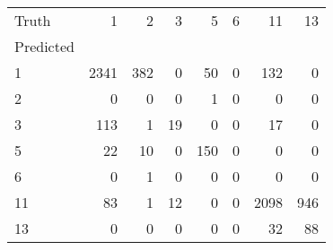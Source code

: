 \begin{tabular}{lrrrrrrr}
\toprule
Truth & 1 & 2 & 3 & 5 & 6 & 11 & 13 \\
Predicted &  &  &  &  &  &  &  \\
\midrule
1 & 2341 & 382 & 0 & 50 & 0 & 132 & 0 \\
2 & 0 & 0 & 0 & 1 & 0 & 0 & 0 \\
3 & 113 & 1 & 19 & 0 & 0 & 17 & 0 \\
5 & 22 & 10 & 0 & 150 & 0 & 0 & 0 \\
6 & 0 & 1 & 0 & 0 & 0 & 0 & 0 \\
11 & 83 & 1 & 12 & 0 & 0 & 2098 & 946 \\
13 & 0 & 0 & 0 & 0 & 0 & 32 & 88 \\
\bottomrule
\end{tabular}
